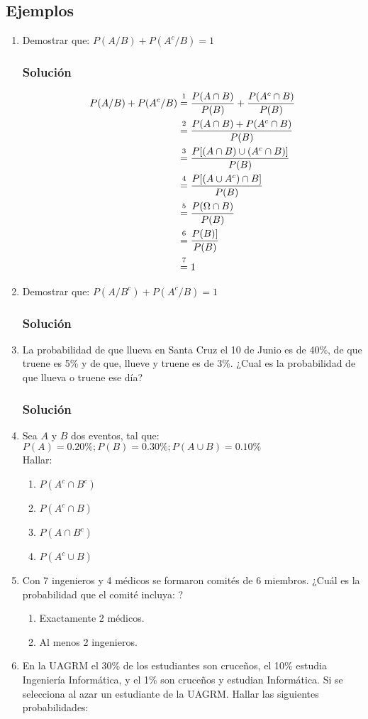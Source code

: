 \subsection{Ejemplos}
\begin{enumerate}
\item Demostrar que: $P(A/B)+P(A^c/B)=1$
\subsubsection{Solución}
\begin{align*}
P(A/B)+P(A^c/B) &\varstackrel{1}{=} \dfrac{P(A\cap B)}{P(B)} + \dfrac{P(A^c\cap B)}{P(B)} \\
  &\varstackrel{2}{=} \dfrac{P(A\cap B)+P(A^c\cap B)}{P(B)} \\
    &\varstackrel{3}{=} \dfrac{P[(A\cap B)\cup(A^c\cap B)]}{P(B)} \\
      &\varstackrel{4}{=} \dfrac{P[(A\cup A^c)\cap B]}{P(B)} \\
        &\varstackrel{5}{=} \dfrac{P(\Omega\cap B)}{P(B)} \\
           &\varstackrel{6}{=} \dfrac{P(B)]}{P(B)} \\
                 &\varstackrel{7}{=} 1 \\
\end{align*}
\item Demostrar que: $P(A/B^c)+P(A^c/B)=1$
\subsubsection{Solución}
\item La probabilidad de que llueva en Santa Cruz el 10 de Junio es de 40\%, de que truene es 5\% y de que, llueve y truene es de 3\%. ¿Cual es la probabilidad de que llueva o truene ese día?
\subsubsection{Solución}
\item Sea $A$ y $B$ dos eventos, tal que: $P(A)=0.20\% ; P(B)=0.30\%;P(A\cup B)=0.10\%$ \\ Hallar:
\begin{enumerate}[label=(\alph*)]
\item $P(A^c\cap B^c)$
\item $P(A^c\cap B)$
\item $P(A\cap B^c)$
\item $P(A^c\cup B)$
\end{enumerate}
\item Con 7 ingenieros y 4 médicos se formaron comités de 6 miembros. ¿Cuál es la probabilidad que el comité incluya: ?
\begin{enumerate}[label=(\alph*)]
\item Exactamente 2 médicos.
\item Al menos 2 ingenieros.
\end{enumerate}
\item En la UAGRM el 30\% de los estudiantes son cruceños, el 10\% estudia Ingeniería Informática, y el 1\% son cruceños y estudian Informática. Si se selecciona al azar un estudiante de la UAGRM. Hallar las siguientes probabilidades:
\end{enumerate}
